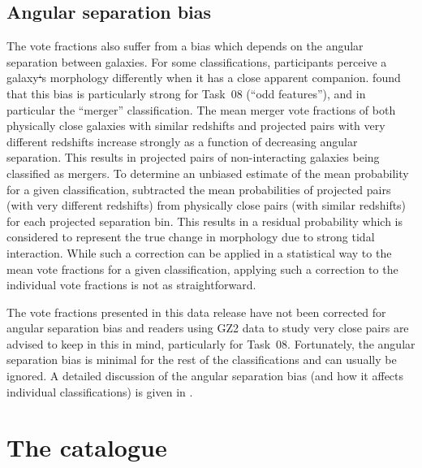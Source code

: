 \documentclass[useAMS,usenatbib]{mn2e}
\providecommand{\DIFaddtex}[1]{{\protect\color{blue}\uwave{#1}}} %
\providecommand{\DIFdeltex}[1]{{\protect\color{red}\sout{#1}}}                      %
\providecommand{\DIFaddbegin}{} %
\providecommand{\DIFaddend}{} %
\providecommand{\DIFdelbegin}{} %
\providecommand{\DIFdelend}{} %
\providecommand{\DIFadd}[1]{\texorpdfstring{\DIFaddtex{#1}}{#1}} %
\providecommand{\DIFdel}[1]{\texorpdfstring{\DIFdeltex{#1}}{}} %
\begin{document}
\subsection{Angular separation bias}\label{ang-bias}

The vote fractions also suffer from a bias which depends on the angular separation between galaxies. For some classifications, participants perceive a galaxy\DIFdelbegin \DIFdel{`}\DIFdelend \DIFaddbegin \DIFadd{'}\DIFaddend s morphology differently when it has a close apparent companion. \citet{cas13} found that this bias is particularly strong for Task~08 (``odd features''), and in particular the ``merger'' classification. The mean merger vote fractions of both physically close galaxies with similar redshifts and projected pairs with very different redshifts increase strongly as a function of decreasing angular separation. This results in projected pairs of non-interacting galaxies being classified as mergers. To determine an unbiased estimate of the mean probability for a given classification, \citet{cas13} subtracted the mean probabilities of projected pairs (with very different redshifts) from physically close pairs (with similar redshifts) for each projected separation bin. This results in a residual probability which is considered to represent the true change in morphology due to strong tidal interaction. While such a correction can be applied in a statistical way to the mean vote fractions for a given classification, applying such a correction to the individual vote fractions is not as straightforward.

The vote fractions presented in this data release have not been corrected for angular separation bias and readers using GZ2 data to study very close pairs are advised to keep in this in mind, particularly for Task~08. Fortunately, the angular separation bias is minimal for the rest of the classifications and can usually be ignored. A detailed discussion of the angular separation bias (and how it affects individual classifications) is given in \citet{cas13}.


\section{The catalogue} \label{sec-catalogue}

\end{document}

